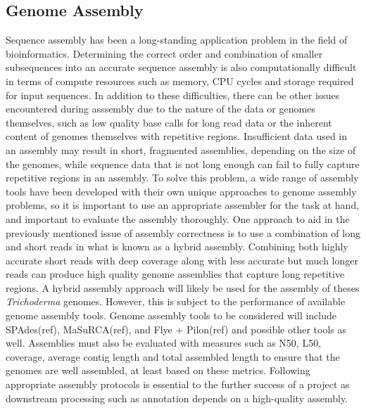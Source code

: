 \documentclass[12pt]{article}
\begin{document}
\subsection{Genome Assembly}

Sequence assembly has been a long-standing application problem in the
field of bioinformatics\cite{assembly}. Determining the correct order
and combination of smaller subsequences into an accurate sequence
assembly is also computationally difficult in terms of compute
resources such as memory, CPU cycles and storage required for input
sequences\cite{assembly}. In addition to these difficulties, there can
be other issues encountered during asssembly due to the nature of the
data or genomes themselves, such as low quality base calls for long
read data or the inherent content of genomes themselves with
repetitive regions. Insufficient data used in an assembly may result
in short, fragmented assemblies, depending on the size of the genomes,
while sequence data that is not long enough can fail to fully capture
repetitive regions in an assembly. To solve this problem, a wide range
of assembly tools have been developed with their own unique approaches
to genome assembly problems, so it is important to use an appropriate
assembler for the task at hand, and important to evaluate the assembly
thoroughly. One approach to aid in the previously mentioned issue of
assembly correctness is to use a combination of long and short reads
in what is known as a hybrid assembly. Combining both highly accurate
short reads with deep coverage along with less accurate but much
longer reads can produce high quality genome assemblies that capture
long repetitive regions. A hybrid assembly approach will likely be
used for the assembly of theses \textit{Trichoderma} genomes. However,
this is subject to the performance of available genome assembly
tools. Genome assembly tools to be considered will include
SPAdes(ref), MaSuRCA(ref), and Flye + Pilon(ref) and possible other
tools as well.  Assemblies must also be evaluated with measures such
as N50, L50, coverage, average contig length and total assembled
length to ensure that the genomes are well assembled, at least based
on these metrics\cite{assembly}. Following appropriate assembly
protocols is essential to the further success of a project as
downstream processing such as annotation depends on a high-quality
assembly.
\end{document}
